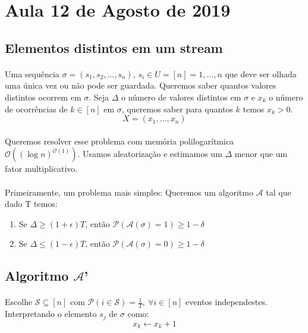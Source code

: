 

\section{Aula 12 de Agosto de 2019}
\label{2019_08_12}
\subsection{Elementos distintos em um stream}
\paragraph{} Uma sequência $\sigma = (s_1, s_2, ..., s_n)$, $s_i \in U = [n] = {1, ..., n}$ que deve ser olhada uma única vez ou não pode ser guardada. Queremos saber quantos valores distintos ocorrem em $\sigma$. Seja $\Delta$ o número de valores distintos em $\sigma$ e $x_k$ o número de ocorrências de $k \in [n]$ em $\sigma$, queremos saber para quantos $k$ temos $x_k>0$.
$$X = (x_1, ..., x_n)$$
\paragraph{} Queremos resolver esse problema com memória polilogarítmica $\mathcal{O}((\log{}n)^{\mathcal{O}(1)})$. Usamos aleatorização e estimamos um $\Delta$ menor que um fator multiplicativo.
\paragraph{}Primeiramente, um problema mais simples: Queremos um algoritmo $\mathcal{A}$ tal que dado T temos:
\begin{enumerate}
    \centering
    \item Se $\Delta \geq (1+\epsilon)T$, então $\mathcal{P}(\mathcal{A}(\sigma) = 1) \geq 1 - \delta$
    \item Se $\Delta \leq (1-\epsilon)T$, então $\mathcal{P}(\mathcal{A}(\sigma) = 0) \geq 1 - \delta$
\end{enumerate}

\subsection{Algoritmo $\mathcal{A}$'}
\paragraph{} Escolhe $\mathcal{S} \subseteq [n]$ com $\mathcal{P}( i \in \mathcal{S}) = \frac{1}{T},\ \forall i \in [n]$ eventos independestes. Interpretando o elemento $s_j$ de $\sigma$ como:
$$x_k \leftarrow x_k + 1$$
